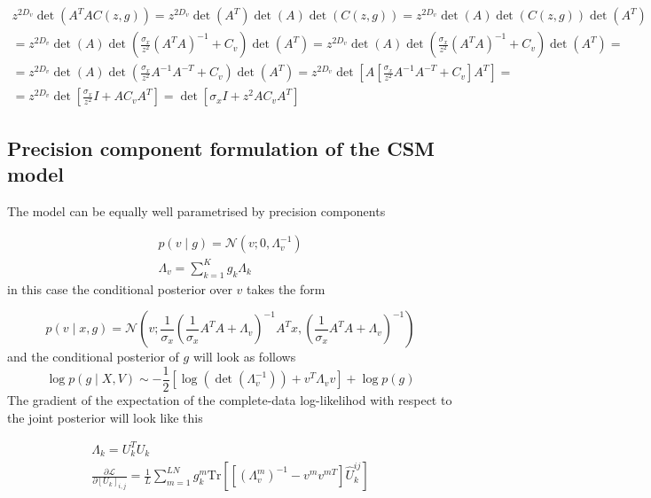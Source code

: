 \documentclass{paper}
\begin{document}
\begin{equation}
\begin{split}
z^{2 D_v} \det(A^TA C(z,g)) = z^{2 D_v} \det(A^T) \det(A) \det(C(z,g)) = z^{2 D_v} \det(A) \det(C(z,g)) \det(A^T)\\
= z^{2 D_v} \det(A) \det(\frac{\sigma_x}{z^2} (A^TA)^{-1} + C_v) \det(A^T) = 
z^{2 D_v} \det(A) \det(\frac{\sigma_x}{z^2} (A^TA)^{-1} + C_v) \det(A^T) = \\
= z^{2 D_v} \det(A) \det(\frac{\sigma_x}{z^2} A^{-1}A^{-T} + C_v) \det(A^T) = 
z^{2 D_v} \det \left[ A \left[ \frac{\sigma_x}{z^2} A^{-1}A^{-T} + C_v \right] A^T \right] = \\
= z^{2 D_v} \det \left[  \frac{\sigma_x}{z^2} I + A C_v A^T \right] =
\det \left[  \sigma_x I + z^2 A C_v A^T \right]
\end{split}
\end{equation}


\subsection{Precision component formulation of the CSM model}

The model can be equally well parametrised by precision components

\begin{eqnarray}
p(v \mid g) = \mathcal{N}(v; 0,\Lambda_v^{-1}) \\
\Lambda_v = \sum_{k=1}^K g_k \Lambda_k \label{eq:cv}
\end{eqnarray}
%
in this case the conditional posterior over $v$ takes the form

\begin{equation}
p(v \mid x,g) = \mathcal{N}\left(v; \frac{1}{\sigma_x} \left(\frac{1}{\sigma_x} A^T A + \Lambda_v \right)^{-1} A^T x, \left(\frac{1}{\sigma_x} A^T A + \Lambda_v\right)^{-1}\right)
\end{equation}
%
and the conditional posterior of $g$ will look as follows
\begin{equation} 
\log p(g \mid X,V) \sim -\frac{1}{2} \left[ \log(\det(\Lambda_v^{-1})) + v^T \Lambda_v v\right] + \log p(g)
\end{equation}
%
The gradient of the expectation of the complete-data log-likelihod with respect to the joint posterior will look like this

\begin{eqnarray}
\Lambda_k = U_k^T U_k \\
\frac{\partial \mathcal{L}}{\partial \left[ U_k \right]_{i,j}} = \frac{1}{L} \sum_{m=1}^{LN} g_k^{m} \textrm{Tr} \left[ \left[ \left( \Lambda_v^m \right)^{-1} - v^m v^{mT} \right] \hat U_k^{ij} \right]
\end{eqnarray}
\end{document}
